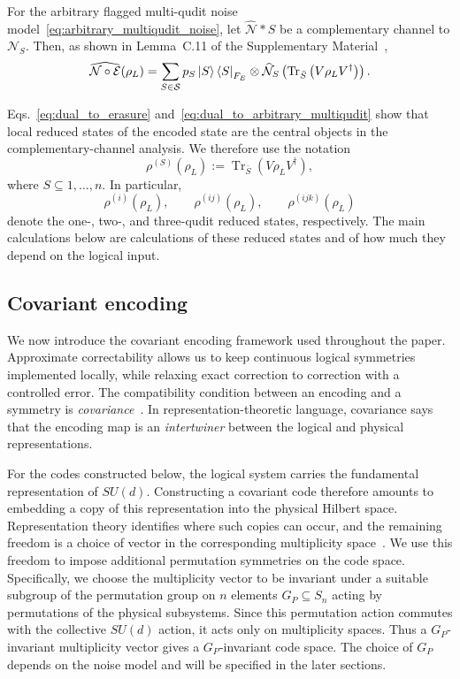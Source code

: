 \documentclass[10pt,twocolumn,superscriptaddress,aps,amsmath,amssymb,citeautoscript,floatfix,prx,longbibliography]{revtex4-2}
\theoremstyle{plain}
\theoremstyle{plain}
\theoremstyle{plain}
\theoremstyle{plain}
\theoremstyle{plain}
\theoremstyle{plain}
\begin{document}
For the arbitrary flagged multi-qudit noise model~\eqref{eq:arbitrary_multiqudit_noise}, let $\widehat{\mathcal N}*S$ be a complementary channel to $\mathcal N_S$. Then, as shown in Lemma~C.11 of the Supplementary Material~\cite{SuppMat},
\begin{equation}\label{eq:dual_to_arbitrary_multiqudit}
\widehat{\mathcal N\circ\mathcal E}(\rho_L)
=
\sum_{S\in\mathcal S}
p_S
\ket S\bra S_{F_E}
\otimes
\widehat{\mathcal N}_S
\left(
\operatorname{Tr}_{\bar S}
\left(
V\rho_LV^\dagger
\right)
\right).
\end{equation}

Eqs.~\eqref{eq:dual_to_erasure} and~\eqref{eq:dual_to_arbitrary_multiqudit} show that local reduced states of the encoded state are the central objects in the complementary-channel analysis. We therefore use the notation
\begin{equation}\label{eq:reduced_state}
\rho^{(S)}(\rho_L)
:=
\operatorname{Tr}_{\bar S}
\left(
V\rho_LV^\dagger
\right),
\end{equation}
where $S\subseteq{1,\ldots,n}$. In particular,
$$
\rho^{(i)}(\rho_L),
\qquad
\rho^{(ij)}(\rho_L),
\qquad
\rho^{(ijk)}(\rho_L)
$$
denote the one-, two-, and three-qudit reduced states, respectively. The main calculations below are calculations of these reduced states and of how much they depend on the logical input.

\subsection{Covariant encoding}\label{subsec:main_covar_enc}

We now introduce the covariant encoding framework used throughout the paper. Approximate correctability allows us to keep continuous logical symmetries implemented locally, while relaxing exact correction to correction with a controlled error. The compatibility condition between an encoding and a symmetry is \textit{covariance}~\cite{Hayden2021}. In representation-theoretic language, covariance says that the encoding map is an \textit{intertwiner} between the logical and physical representations.

For the codes constructed below, the logical system carries the fundamental representation of $SU(d)$. Constructing a covariant code therefore amounts to embedding a copy of this representation into the physical Hilbert space. Representation theory identifies where such copies can occur, and the remaining freedom is a choice of vector in the corresponding multiplicity space~\cite{Denys2024}. We use this freedom to impose additional permutation symmetries on the code space. Specifically, we choose the multiplicity vector to be invariant under a suitable subgroup of the permutation group on $n$ elements $G_P\subseteq S_n$ acting by permutations of the physical subsystems. Since this permutation action commutes with the collective $SU(d)$ action, it acts only on multiplicity spaces. Thus a $G_P$-invariant multiplicity vector gives a $G_P$-invariant code space. The choice of $G_P$ depends on the noise model and will be specified in the later sections.
\end{document}
